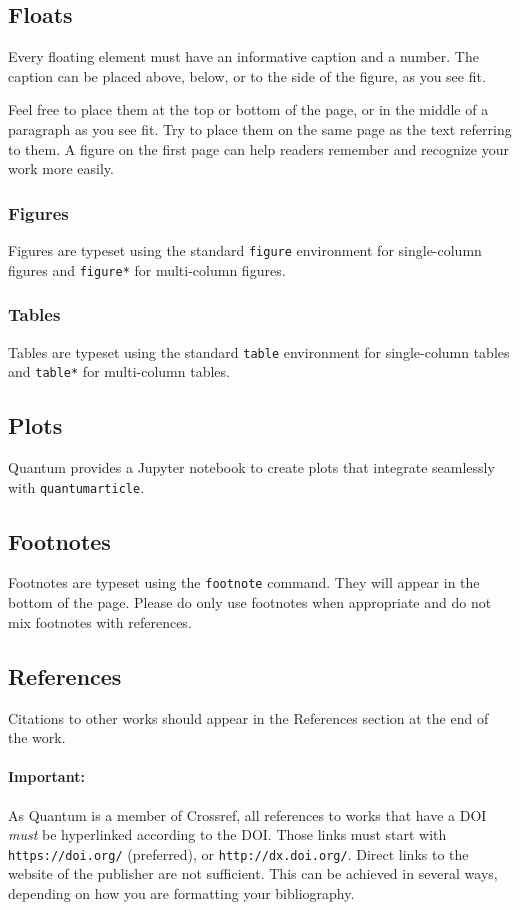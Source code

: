 \documentclass[a4paper,noarxiv,onecolumn]{quantumarticle}
\begin{document}
	\subsection{Floats}	
	Every floating element must have an informative caption and a number. The caption can be placed above, below, or to the side of the figure, as you see fit.
	
	Feel free to place them at the top or bottom of the page, or in the middle of a paragraph as you see fit. Try to place them on the same page as the text referring to them. A figure on the first page can help readers remember and recognize your work more easily.
	
	\subsubsection{Figures}
	Figures are typeset using the standard \texttt{figure} environment for single-column figures and \texttt{figure*} for multi-column figures. 
	
	\subsubsection{Tables}
	Tables are typeset using the standard \texttt{table} environment for single-column tables and \texttt{table*} for multi-column tables. 
	
	\subsection{Plots}
	Quantum provides a Jupyter notebook to create plots that integrate seamlessly with \texttt{quantumarticle}.
	
	\subsection{Footnotes}
	Footnotes are typeset using the \texttt{footnote} command. They will appear in the bottom of the page. Please do only use footnotes when appropriate and do not mix footnotes with references.
	
	\subsection{References}	
	Citations to other works should appear in the References section at the end of the work.
	
	\paragraph{Important:} As Quantum is a member of Crossref, all references to works that have a DOI \emph{must} be hyperlinked according to the DOI. Those links must start with \texttt{https://doi.org/} (preferred), or \texttt{http://dx.doi.org/}. Direct links to the website of the publisher are not sufficient. This can be achieved in several ways, depending on how you are formatting your bibliography.
	
\end{document}
